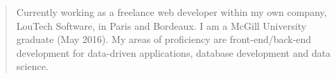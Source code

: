 \begin{quote}
Currently working as a freelance web developer within my own company, LouTech Software, in Paris and Bordeaux. I am a McGill University graduate (May 2016).
My areas of proficiency are front-end/back-end development for data-driven applications, database development and data science.
\end{quote}





\divider\smallskip


\divider\smallskip


\divider\smallskip



\divider\smallskip







\begin{minipage}{0.20\textwidth}
\end{minipage}%
\begin{minipage}{0.22\textwidth}
\end{minipage}%
\begin{minipage}{0.15\textwidth}
\end{minipage}%








